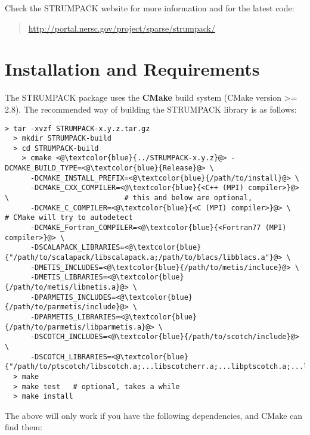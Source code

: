 \documentclass{article}
\begin{document}
\noindent Check the STRUMPACK website for more information and for the
latest code:
\begin{quote}
  \url{http://portal.nersc.gov/project/sparse/strumpack/}
\end{quote}


\section{Installation and Requirements}\label{sec::installation}
The STRUMPACK package uses the \textbf{CMake} build system (CMake
version >= 2.8). The recommended way of building the STRUMPACK library
is as follows:
\begin{lstlisting}[style=bash]
  > tar -xvzf STRUMPACK-x.y.z.tar.gz
  > mkdir STRUMPACK-build
  > cd STRUMPACK-build
    > cmake <@\textcolor{blue}{../STRUMPACK-x.y.z}@> -DCMAKE_BUILD_TYPE=<@\textcolor{blue}{Release}@> \
      -DCMAKE_INSTALL_PREFIX=<@\textcolor{blue}{/path/to/install}@> \
      -DCMAKE_CXX_COMPILER=<@\textcolor{blue}{<C++ (MPI) compiler>}@> \                           # this and below are optional,
      -DCMAKE_C_COMPILER=<@\textcolor{blue}{<C (MPI) compiler>}@> \                               # CMake will try to autodetect
      -DCMAKE_Fortran_COMPILER=<@\textcolor{blue}{<Fortran77 (MPI) compiler>}@> \
      -DSCALAPACK_LIBRARIES=<@\textcolor{blue}{"/path/to/scalapack/libscalapack.a;/path/to/blacs/libblacs.a"}@> \
      -DMETIS_INCLUDES=<@\textcolor{blue}{/path/to/metis/incluce}@> \
      -DMETIS_LIBRARIES=<@\textcolor{blue}{/path/to/metis/libmetis.a}@> \
      -DPARMETIS_INCLUDES=<@\textcolor{blue}{/path/to/parmetis/include}@> \
      -DPARMETIS_LIBRARIES=<@\textcolor{blue}{/path/to/parmetis/libparmetis.a}@> \
      -DSCOTCH_INCLUDES=<@\textcolor{blue}{/path/to/scotch/include}@> \
      -DSCOTCH_LIBRARIES=<@\textcolor{blue}{"/path/to/ptscotch/libscotch.a;...libscotcherr.a;...libptscotch.a;...libptscotcherr.a"}@>
  > make
  > make test   # optional, takes a while
  > make install
\end{lstlisting}
The above will only work if you have the following dependencies, and
CMake can find them:
\end{document}
